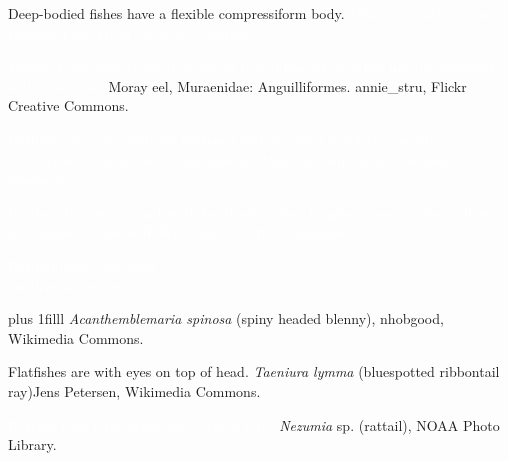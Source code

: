 \documentclass[t,handout]{beamer}  %
\begin{document}
{
\begin{frame}[b,plain]{Deep-bodied fishes have a flexible \textcolor{orange6}{compressiform} body.}
\hfill\tiny\textcolor{white}{\textit{Chaetodon melannotus}, Leonard Low, Flickr Creative Commons.}
\end{frame}
}

{
\begin{frame}[b,plain]{\textcolor{white}{Eel-like fishes have reduced or absent paired fins. Median fins may be confluent with caudal fin.}}
\hfill\tiny\textcolor{orange7}{Moray eel, Muraenidae: Anguilliformes. annie\_stru, Flickr Creative Commons.}
\end{frame}
}



{
\begin{frame}[b,plain]{\textcolor{white}{Bottom-rovers are ventrally flattened with terminal to inferior mouths.}}
\hfill\tiny\textcolor{white}{\textit{File:Upeneichthys lineatus} (blue-lined goatfish, Ian Skipworth, Wikimedia Commons.}
\end{frame}
}

{
\begin{frame}[b,plain]{\textcolor{white}{Bottom clingers are small with fused pelvic fins.}}
\hfill\tiny\textcolor{white}{\textit{Cryptocentrus cinctus} (yellow prawn-goby), Nicolas Keller, Flickr Creative Commons.}
\end{frame}
}

{
\begin{frame}[t,plain]{}

\hangpara\Large\textcolor{white}{Bottom hiders are small \\
and live in crevices.}

\vskip0pt plus 1filll
\tiny\textcolor{white!80!black}{\textit{Acanthemblemaria spinosa} (spiny headed blenny), nhobgood, Wikimedia Commons.}
\end{frame}
}

{
\begin{frame}[b,plain]{Flatfishes are  with eyes on top of head.}
\tiny\textit{Taeniura lymma} (bluespotted ribbontail ray)\hfill Jens Petersen, Wikimedia Commons.
\end{frame}
}


{
\begin{frame}[b,plain]{\textcolor{white}{Rattails have large heads and tapered tails.}}
\tiny\textcolor{white!80!black}{\textit{Nezumia} sp. (rattail), NOAA Photo Library.}
\end{frame}
}
\end{document}
